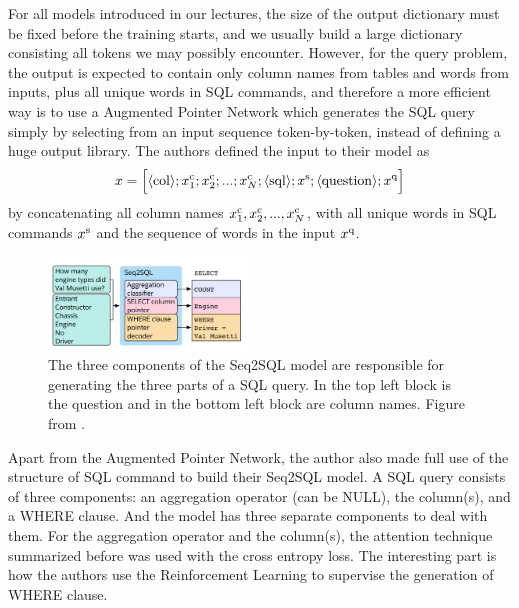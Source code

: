 For all models introduced in our lectures, the size of the output dictionary must be fixed before the training starts, and we usually build a large dictionary consisting all tokens we may possibly encounter. However, for the query problem, the output is expected to contain only column names from tables and words from inputs, plus all unique words in SQL commands, and therefore a more efficient way is to use a Augmented Pointer Network which generates the SQL query simply by selecting from an input sequence token-by-token, instead of defining a huge output library. The authors defined the input to their model as
\begin{align*}
    x = \Big[\langle {\rm col} \rangle; x_1^{\rm c};x_2^{\rm c};...;x_N^{\rm c};\langle {\rm sql} \rangle; x^{\rm s}; \langle {\rm question} \rangle; x^{\rm q} \Big]
\end{align*}
by concatenating all column names $x_1^{\rm c}, x_2^{\rm c},...,x_N^{\rm c}$, with all unique words in SQL commands $x^{\rm s}$ and the sequence of words in the input $x^{\rm q}$. 


\begin{figure}[ht!]
    \centering
    \includegraphics[width = 200px]{proposal/Seq2SQL_model.png} 
    \caption{The three components of the Seq2SQL model are responsible for generating the three parts of a SQL query. In the top left block is the question and in the bottom left block are column names. Figure from \cite{zhong2017seq2sql}.}
    \label{app1}
\end{figure}

Apart from the Augmented Pointer Network, the author also made full use of the structure of SQL command to build their Seq2SQL model. A SQL query consists of three components: an aggregation operator (can be NULL), the column(s), and a WHERE clause. And the model has three separate components to deal with them. For the aggregation operator and the column(s), the attention technique summarized before was used with the cross entropy loss. The interesting part is how the authors use the Reinforcement Learning to supervise the generation of WHERE clause.

